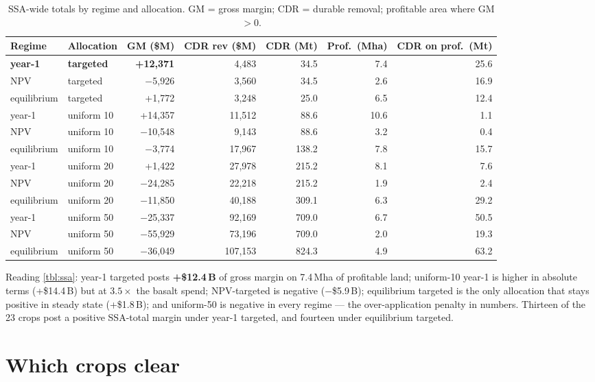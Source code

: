 \documentclass[openany]{book}
\begin{document}
{\footnotesize
\begin{longtable}[]{@{}llrrrrr@{}}
\caption{SSA-wide totals by regime and allocation. GM = gross margin;
CDR = durable removal; profitable area where GM$>0$.}\label{tbl:ssa}\\
\toprule
Regime & Allocation & GM (\$M) & CDR rev (\$M) & CDR (Mt) & Prof.\ (Mha) &
CDR on prof.\ (Mt) \\
\midrule
\endhead
\textbf{year-1} & \textbf{targeted} & \textbf{+12,371} & 4,483 & 34.5 & 7.4 & 25.6 \\
NPV & targeted & $-$5,926 & 3,560 & 34.5 & 2.6 & 16.9 \\
equilibrium & targeted & +1,772 & 3,248 & 25.0 & 6.5 & 12.4 \\
year-1 & uniform 10 & +14,357 & 11,512 & 88.6 & 10.6 & 1.1 \\
NPV & uniform 10 & $-$10,548 & 9,143 & 88.6 & 3.2 & 0.4 \\
equilibrium & uniform 10 & $-$3,774 & 17,967 & 138.2 & 7.8 & 15.7 \\
year-1 & uniform 20 & +1,422 & 27,978 & 215.2 & 8.1 & 7.6 \\
NPV & uniform 20 & $-$24,285 & 22,218 & 215.2 & 1.9 & 2.4 \\
equilibrium & uniform 20 & $-$11,850 & 40,188 & 309.1 & 6.3 & 29.2 \\
year-1 & uniform 50 & $-$25,337 & 92,169 & 709.0 & 6.7 & 50.5 \\
NPV & uniform 50 & $-$55,929 & 73,196 & 709.0 & 2.0 & 19.3 \\
equilibrium & uniform 50 & $-$36,049 & 107,153 & 824.3 & 4.9 & 63.2 \\
\bottomrule
\end{longtable}
}

Reading \autoref{tbl:ssa}: year-1 targeted posts \textbf{+\$12.4\,B} of gross
margin on 7.4\,Mha of profitable land; uniform-10 year-1 is higher in absolute
terms (+\$14.4\,B) but at $3.5\times$ the basalt spend; NPV-targeted is negative
($-$\$5.9\,B); equilibrium targeted is the only allocation that stays positive
in steady state (+\$1.8\,B); and uniform-50 is negative in every regime --- the
over-application penalty in numbers. Thirteen of the 23 crops post a positive
SSA-total margin under year-1 targeted, and fourteen under equilibrium
targeted.

\section{Which crops clear}
\end{document}
